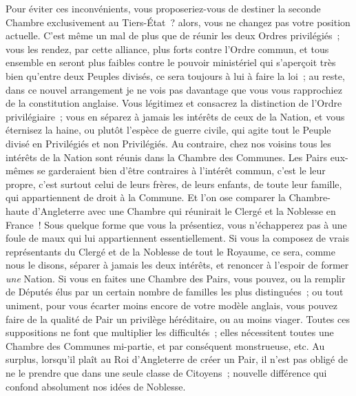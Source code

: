 \documentclass[french,twoside]{book} %
\begin{document}
Pour éviter ces inconvénients, vous proposeriez-vous de destiner la seconde Chambre exclusivement au Tiers-État ? alors, vous ne changez pas votre position actuelle. C’est même un mal de plus que de réunir les deux Ordres privilégiés ; vous les rendez, par cette alliance, plus forts contre l’Ordre commun, et tous ensemble en seront plus faibles contre le pouvoir ministériel qui s’aperçoit très bien qu’entre deux Peuples divisés, ce sera toujours à lui à faire la loi ; au reste, dans ce nouvel arrangement je ne vois pas davantage que vous vous rapprochiez de la constitution anglaise. Vous légitimez et consacrez la distinction de l’Ordre privilégiaire ; vous en séparez à jamais les intérêts de ceux de la Nation, et vous éternisez la haine, ou plutôt l’espèce de guerre civile, qui agite tout le Peuple divisé en Privilégiés et non Privilégiés. Au contraire, chez nos voisins tous les intérêts de la Nation sont réunis dans la Chambre des Communes. Les Pairs eux-mêmes se garderaient bien d’être contraires à l’intérêt commun, c’est le leur propre, c’est surtout celui de leurs frères, de leurs enfants, de toute leur famille, qui appartiennent de droit à la Commune. Et l’on ose comparer la Chambre-haute d’Angleterre avec une Chambre qui réunirait le Clergé et la Noblesse en France ! Sous quelque forme que vous la présentiez, vous n’échapperez pas à une foule de maux qui lui appartiennent essentiellement. Si vous la composez de vrais représentants du Clergé et de la Noblesse de tout le Royaume, ce sera, comme nous le disons, séparer à jamais les deux intérêts, et renoncer à l’espoir de former {\itshape une} Nation. Si vous en faites une Chambre des Pairs, vous pouvez, ou la remplir de Députés élus par un certain nombre de familles les plus distinguées ; ou tout uniment, pour vous écarter moins encore de votre modèle anglais, vous pouvez faire de la qualité de Pair un privilège héréditaire, ou au moins viager. Toutes ces suppositions ne font que multiplier les difficultés ; elles nécessitent toutes une Chambre des Communes mi-partie, et par conséquent monstrueuse, etc. Au surplus, lorsqu’il plaît au Roi d’Angleterre de créer un Pair, il n’est pas obligé de ne le prendre que dans une seule classe de Citoyens ; nouvelle différence qui confond absolument nos idées de Noblesse.\par
\end{document}
